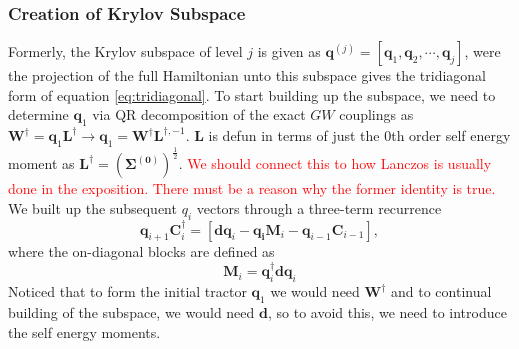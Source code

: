 \documentclass[12pt]{article} %
\newcommand{\red}[1]{\textcolor{red}{#1}}
\begin{document}
\subsubsection{Creation of Krylov Subspace}
Formerly, the Krylov subspace of level $j$ is given as $\mathbf{q}^{(j)}=\left[\mathbf{q}_1, \mathbf{q}_2, \cdots, \mathbf{q}_j\right]$, were the projection of the full Hamiltonian unto this subspace gives the tridiagonal form of equation \ref{eq:tridiagonal}. To start building up the subspace, we need to determine $\mathbf{q}_1$ via QR decomposition of the exact $GW$ couplings as $\mathbf{W}^\dag = \mathbf{q}_1 \mathbf{L}^\dag \rightarrow \mathbf{q}_1 = \mathbf{W}^\dag \mathbf{L}^{\dag, -1}$. $\mathbf{L}$ is defun in terms of just the 0th order self energy moment as $\mathbf{L}^\dag = \left(\boldsymbol{\Sigma ^{(0)}}\right)^{\frac{1}{2}}$. \red{We should connect this to how Lanczos is usually done in the exposition. There must be a reason why the former identity is true.} We built up the subsequent $q_i$ vectors through a three-term recurrence
\begin{equation}
    \mathbf{q}_{i+1} \mathbf{C}_i^{\dagger}=\left[\mathbf{d} \mathbf{q}_i-\mathbf{q}_{\mathbf{i}} \mathbf{M}_i-\mathbf{q}_{i-1} \mathbf{C}_{i-1}\right],
\end{equation}
where the on-diagonal blocks are defined as
\begin{equation}
    \mathbf{M}_i=\mathbf{q}_i^{\dagger} \mathbf{d} \mathbf{q}_i
\end{equation}
Noticed that to form the initial tractor $\mathbf{q}_1$ we would need $\mathbf{W}^\dag$ and to continual building of the subspace, we would need $\mathbf{d}$, so to avoid this, we need to introduce the self energy moments.
\end{document}
